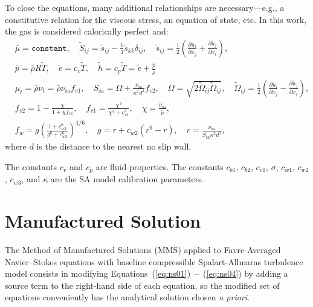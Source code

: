 \documentclass[10pt]{article}
\newcommand{\pp}[2]{\frac{\partial #1}{\partial #2}}
\newcommand{\sa}{\nu_{\mathrm{sa}}}
\begin{document}
To close the equations, many additional relationships are
necessary---e.g., a constitutive relation for the viscous stress, an
equation of state, etc. In this work, the gas is considered calorically perfect and:
%
\begin{equation}
 \begin{split}\label{eq:closure}
&\bar{\mu} =\texttt{constant}, \quad \tilde{S}_{ij} = \tilde{s}_{ij} - \frac{1}{3} \tilde{s}_{kk} \delta_{ij}, \quad \tilde{s}_{ij} = \frac{1}{2} \left( \pp{\tilde{u}_i}{x_j} + \pp{\tilde{u}_j}{x_i} \right), \\
&\bar{p} = \bar{\rho} R \tilde{T}, \quad \tilde{e} = c_v \tilde{T}, \quad \tilde{h} = c_p \tilde{T} = \tilde{e} + \frac{\bar{p}}{\bar{\rho}} \\
&\mu_t = \bar{\rho} \nu_t = \bar{\rho} \sa f_{v1}, \quad S_{\mathrm{sa}} = \Omega + \frac{\sa}{\kappa^2 d^2} f_{v2}, \quad \Omega = \sqrt{2 \tilde{\Omega}_{ij} \tilde{\Omega}_{ij} }, \quad \widetilde{\Omega}_{ij} = \frac{1}{2} \left( \pp{\tilde{u}_i}{x_j} - \pp{\tilde{u}_j}{x_i} \right), \\
&f_{v2} = 1 - \frac{\chi}{1 + \chi f_{v1}}, \quad f_{v1} = \frac{\chi^3}{\chi^3 + c_{v1}^3}, \quad \chi = \frac{\sa}{\tilde{\nu}}, \\
&f_w = g \left( \frac{1 + c_{w3}^6}{g^6 + c_{w3}^6} \right)^{1/6}, \quad g = r + c_{w2} \left( r^6 - r \right), \quad r = \frac{\sa}{S_{\mathrm{sa}} \kappa^2 d^2}, 
 \end{split}
\end{equation}
%
where $d$ is the distance to the nearest no slip wall.

The constants $c_v$ and $c_p$ are fluid properties.  The constants $c_{b1}$, $c_{b2}$, $c_{v1}$, $\sigma$,
$c_{w1}$, $c_{w2}$, $c_{w3}$, and $\kappa$ are the SA model calibration parameters.

\section{Manufactured Solution}

The Method of Manufactured Solutions (MMS) applied to Favre-Averaged Navier--Stokes equations with baseline compressible Spalart-Allmaras turbulence model consists in modifying Equations~(\ref{eq:ns01})~--~(\ref{eq:ns04}) by adding a source term to the right-hand side of each equation, so the modified set of equations conveniently has the analytical solution chosen \textit{a priori}.
\end{document}
